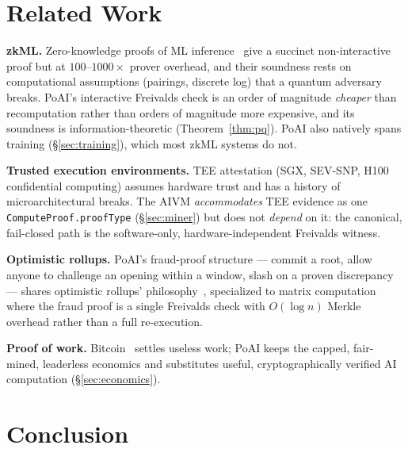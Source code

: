 \documentclass[11pt,a4paper]{article}
\begin{document}
\section{Related Work}

\textbf{zkML.} Zero-knowledge proofs of ML inference~\cite{zkml} give a succinct non-interactive proof but at $100$--$1000\times$ prover overhead, and their soundness rests on computational assumptions (pairings, discrete log) that a quantum adversary breaks. PoAI's interactive Freivalds check is an order of magnitude \emph{cheaper} than recomputation rather than orders of magnitude more expensive, and its soundness is information-theoretic (Theorem~\ref{thm:pq}). PoAI also natively spans training (\S\ref{sec:training}), which most zkML systems do not.

\textbf{Trusted execution environments.} TEE attestation (SGX, SEV-SNP, H100 confidential computing) assumes hardware trust and has a history of microarchitectural breaks. The AIVM \emph{accommodates} TEE evidence as one \texttt{ComputeProof.proofType} (\S\ref{sec:miner}) but does not \emph{depend} on it: the canonical, fail-closed path is the software-only, hardware-independent Freivalds witness.

\textbf{Optimistic rollups.} PoAI's fraud-proof structure --- commit a root, allow anyone to challenge an opening within a window, slash on a proven discrepancy --- shares optimistic rollups' philosophy~\cite{optimistic}, specialized to matrix computation where the fraud proof is a single Freivalds check with $O(\log n)$ Merkle overhead rather than a full re-execution.

\textbf{Proof of work.} Bitcoin~\cite{bitcoin} settles useless work; PoAI keeps the capped, fair-mined, leaderless economics and substitutes useful, cryptographically verified AI computation (\S\ref{sec:economics}).

\section{Conclusion}
\end{document}
